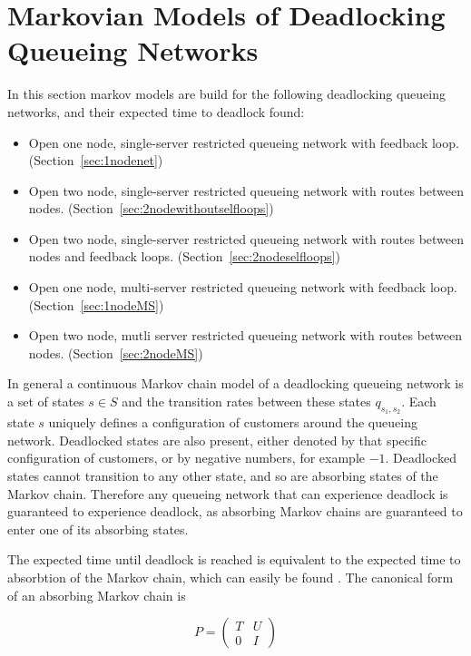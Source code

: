 \documentclass{article}
\begin{document}
\section{Markovian Models of Deadlocking Queueing Networks}\label{sec:markovmodels}

In this section markov models are build for the following deadlocking queueing networks, and their expected time to deadlock found:

\begin{itemize}
  \item Open one node, single-server restricted queueing network with feedback loop. (Section~\ref{sec:1nodenet})
  \item Open two node, single-server restricted queueing network with routes between nodes. (Section~\ref{sec:2nodewithoutselfloops})
  \item Open two node, single-server restricted queueing network with routes between nodes and feedback loops. (Section~\ref{sec:2nodeselfloops})
  \item Open one node, multi-server restricted queueing network with feedback loop. (Section~\ref{sec:1nodeMS})
  \item Open two node, mutli server restricted queueing network with routes between nodes. (Section~\ref{sec:2nodeMS})
\end{itemize}

In general a continuous Markov chain model of a deadlocking queueing network is a set of states $s \in S$ and the transition rates between these states $q_{s_1,s_2}$.
Each state $s$ uniquely defines a configuration of customers around the queueing network.
Deadlocked states are also present, either denoted by that specific configuration of customers, or by negative numbers, for example $-1$.
Deadlocked states cannot transition to any other state, and so are absorbing states of the Markov chain.
Therefore any queueing network that can experience deadlock is guaranteed to experience deadlock, as absorbing Markov chains are guaranteed to enter one of its absorbing states.

The expected time until deadlock is reached is equivalent to the expected time to absorbtion of the Markov chain, which can easily be found \cite{stewart09}.
The canonical form of an absorbing Markov chain is

\begin{equation*}
P = \left(\begin{matrix} T & U\\ 0 & I \end{matrix} \right)
\end{equation*}
\end{document}
